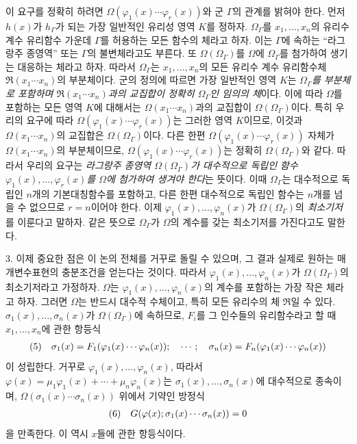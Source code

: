 이 요구를 정확히 하려면 \(\Omega(\varphi_1(x)\cdots\varphi_r(x))\)와 군 \(\Gamma\)의 관계를 밝혀야 한다. 먼저 \(h(x)\)가 \(h_\Gamma\)가 되는 가장 일반적인 유리성 영역 \(K\)를 정하자. \(\Omega_\Gamma\)를 \(x_1,\ldots,x_n\)의 유리수 계수 유리함수 가운데 \(\Gamma\)를 허용하는 모든 함수의 체라고 하자. 이는 \(\Gamma\)에 속하는 ``라그랑주 종영역'' 또는 \(\Gamma\)의 불변체라고도 부른다. 또 \(\Omega(\Omega_\Gamma)\)를 \(\Omega\)에 \(\Omega_\Gamma\)를 첨가하여 생기는 대응하는 체라고 하자. 따라서 \(\Omega_\Gamma\)는 \(x_1,\ldots,x_n\)의 모든 유리수 계수 유리함수체 \(\mathfrak R(x_1\cdots x_n)\)의 부분체이다. 군의 정의에 따르면 가장 일반적인 영역 \(K\)는 \emph{\(\Omega_\Gamma\)를 부분체로 포함하며 \(\mathfrak R(x_1\cdots x_n)\)과의 교집합이 정확히 \(\Omega_\Gamma\)인 임의의 체}이다. 이에 따라 \(\Omega\)를 포함하는 모든 영역 \(K\)에 대해서는 \(\Omega(x_1\cdots x_n)\)과의 교집합이 \(\Omega(\Omega_\Gamma)\)이다. 특히 우리의 요구에 따라 \(\Omega(\varphi_1(x)\cdots\varphi_r(x))\)는 그러한 영역 \(K\)이므로, 이것과 \(\Omega(x_1\cdots x_n)\)의 교집합은 \(\Omega(\Omega_\Gamma)\)이다. 다른 한편 \(\Omega(\varphi_1(x)\cdots\varphi_r(x))\) 자체가 \(\Omega(x_1\cdots x_n)\)의 부분체이므로, \(\Omega(\varphi_1(x)\cdots\varphi_r(x))\)는 정확히 \(\Omega(\Omega_\Gamma)\)와 같다. 따라서 우리의 요구는 \emph{라그랑주 종영역 \(\Omega(\Omega_\Gamma)\)가 대수적으로 독립인 함수 \(\varphi_1(x),\ldots,\varphi_r(x)\)를 \(\Omega\)에 첨가하여 생겨야 한다}는 뜻이다. 이때 \(\Omega_\Gamma\)는 대수적으로 독립인 \(n\)개의 기본대칭함수를 포함하고, 다른 한편 대수적으로 독립인 함수는 \(n\)개를 넘을 수 없으므로 \(r=n\)이어야 한다. 이제 \(\varphi_1(x),\ldots,\varphi_n(x)\)가 \(\Omega(\Omega_\Gamma)\)의 \emph{최소기저}를 이룬다고 말하자. 같은 뜻으로 \(\Omega_\Gamma\)가 \(\Omega\)의 계수를 갖는 최소기저를 가진다고도 말한다.

3. 이제 중요한 점은 이 논의 전체를 거꾸로 돌릴 수 있으며, 그 결과 실제로 원하는 매개변수표현의 충분조건을 얻는다는 것이다. 따라서 \(\varphi_1(x),\ldots,\varphi_n(x)\)가 \(\Omega(\Omega_\Gamma)\)의 최소기저라고 가정하자. \(\Omega\)는 \(\varphi_1(x),\ldots,\varphi_n(x)\)의 계수를 포함하는 가장 작은 체라고 하자. 그러면 \(\Omega\)는 반드시 대수적 수체이고, 특히 모든 유리수의 체 \(\mathfrak R\)일 수 있다. \(\sigma_1(x),\ldots,\sigma_n(x)\)가 \(\Omega(\Omega_\Gamma)\)에 속하므로, \(F_i\)를 그 인수들의 유리함수라고 할 때 \(x_1,\ldots,x_n\)에 관한 항등식
\[
\begin{array}{@{}l@{\quad}l@{}}
(5)& \displaystyle \sigma_1(x)=F_1(\varphi_1(x)\cdots\varphi_n(x));\quad \cdots;\quad \sigma_n(x)=F_n(\varphi_1(x)\cdots\varphi_n(x))
\end{array}
\]
이 성립한다. 거꾸로 \(\varphi_1(x),\ldots,\varphi_n(x)\), 따라서 \(\varphi(x)=\mu_1\varphi_1(x)+\cdots+\mu_n\varphi_n(x)\)는 \(\sigma_1(x),\ldots,\sigma_n(x)\)에 대수적으로 종속이며, \(\Omega(\sigma_1(x)\cdots\sigma_n(x))\) 위에서 기약인 방정식
\[
\begin{array}{@{}l@{\quad}l@{}}
(6)& \displaystyle G(\varphi(x);\sigma_1(x)\cdots\sigma_n(x))=0
\end{array}
\]
을 만족한다. 이 역시 \(x\)들에 관한 항등식이다.

